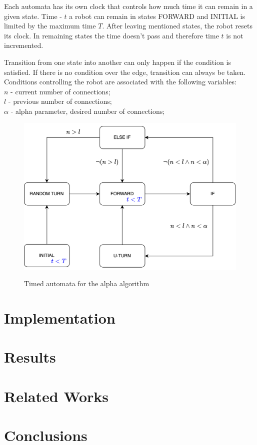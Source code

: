 \documentclass{article}
\begin{document}
Each automata has its own clock that controls how much time it can remain in a given state. Time - $t$ a robot can remain in states FORWARD and INITIAL is limited by the maximum time $T$. After leaving mentioned states, the robot resets its clock. In remaining states the time doesn't pass and therefore time $t$ is not incremented.

Transition from one state into another can only happen if the condition is satisfied. If there is no condition over the edge, transition can always be taken. Conditions controlling the robot are associated with the following variables:\\
$n$ - current number of connections;\\
$l$ - previous number of connections;\\
$\alpha$ - alpha parameter, desired number of connections;\\
\begin{figure}[h!]
\caption{Timed automata for the alpha algorithm}
\includegraphics[scale=0.9]{automaton.png}
\label{fig:automata}
\end{figure}

\section{Implementation}
\section{Results}
\section{Related Works}
\section{Conclusions}



\end{document}
